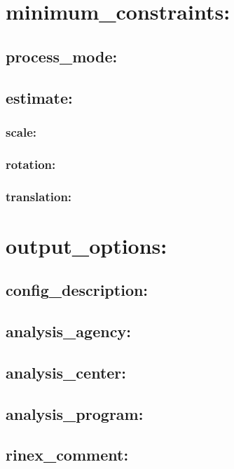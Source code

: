 \section{minimum\_constraints:}

\subsection{process\_mode:}

\subsection{estimate:}

\subsubsection{scale:}

\subsubsection{rotation:}

\subsubsection{translation:}



\section{output\_options:}

\subsection{config\_description:}

\subsection{analysis\_agency:}

\subsection{analysis\_center:}

\subsection{analysis\_program:}

\subsection{rinex\_comment:}




